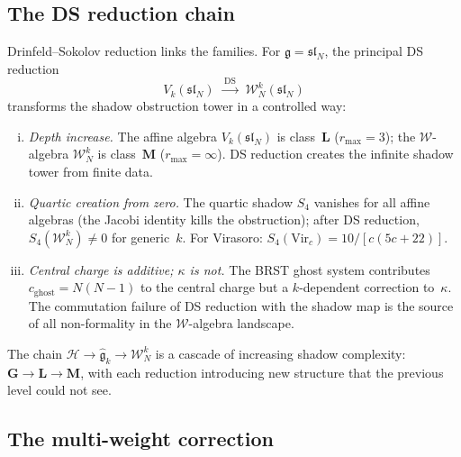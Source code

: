 \documentclass[11pt,reqno]{amsart}
\theoremstyle{definition}
\theoremstyle{remark}
\newcommand{\cH}{\mathcal{H}}
\newcommand{\fg}{\mathfrak{g}}
\newcommand{\Vir}{\mathrm{Vir}}
\numberwithin{equation}{section}
\newcommand{\cW}{\mathcal{W}}
\begin{document}
\subsection{The DS reduction chain}
\label{ssec:ds-chain}

Drinfeld--Sokolov reduction links the families. For
$\fg = \mathfrak{sl}_N$, the principal DS reduction
\begin{equation}\label{eq:ds-chain}
V_k(\mathfrak{sl}_N)
\;\xrightarrow{\;\mathrm{DS}\;}
\;\cW^k_N(\mathfrak{sl}_N)
\end{equation}
transforms the shadow obstruction tower in a controlled
way:
\begin{enumerate}[(i)]
\item \emph{Depth increase.}
 The affine algebra $V_k(\mathfrak{sl}_N)$ is
 class~$\mathbf{L}$ ($r_{\max} = 3$); the
 $\cW$-algebra $\cW^k_N$ is class~$\mathbf{M}$
 ($r_{\max} = \infty$). DS reduction creates the
 infinite shadow tower from finite data.

\item \emph{Quartic creation from zero.}
 The quartic shadow $S_4$ vanishes for all affine
 algebras (the Jacobi identity kills the
 obstruction); after DS reduction,
 $S_4(\cW^k_N) \ne 0$ for generic~$k$.
 For Virasoro:
 $S_4(\Vir_c) = 10/[c(5c+22)]$.

\item \emph{Central charge is additive; $\kappa$ is not.}
 The BRST ghost system contributes
 $c_{\mathrm{ghost}} = N(N{-}1)$ to the central
 charge but a $k$-dependent correction to~$\kappa$.
 The commutation failure of DS reduction with the
 shadow map is the source of all non-formality in
 the $\cW$-algebra landscape.
\end{enumerate}

The chain $\cH \to \widehat{\fg}_k \to \cW^k_N$ is a
cascade of increasing shadow complexity:
$\mathbf{G} \to \mathbf{L} \to \mathbf{M}$, with each
reduction introducing new structure that the previous
level could not see.


\subsection{The multi-weight correction}
\label{ssec:multi-weight-landscape}
\end{document}
